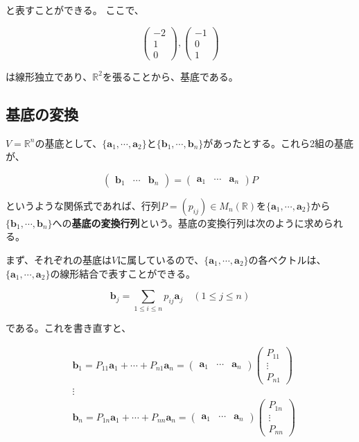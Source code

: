 \documentclass[dvipdfmx,autodetect-engine]{jsarticle}
\newcommand{\vecSpace}[1]{\mathbb{R}^{#1}}
\begin{document}
と表すことができる。
ここで、

$$
\begin{pmatrix}
-2 \\
1 \\
0
\end{pmatrix}, \begin{pmatrix}
-1 \\
0 \\
1
\end{pmatrix} 
$$

は線形独立であり、$\vecSpace{2}$を張ることから、基底である。

\subsection{基底の変換}

$V = \vecSpace{n}$の基底として、$\{\bm{a}_1, \cdots, \bm{a}_2\}$と$\{\bm{b}_1, \cdots, \bm{b}_n\}$があったとする。これら2組の基底が、

$$
\begin{pmatrix}
\bm{b}_1 & \cdots & \bm{b}_n
\end{pmatrix} =
\begin{pmatrix}
\bm{a}_1 & \cdots & \bm{a}_n
\end{pmatrix}P
$$

というような関係式であれば、行列$P = (p_{ij}) \in M_n(\mathbb{R})$を$\{\bm{a}_1, \cdots, \bm{a}_2\}$から$\{\bm{b}_1, \cdots, \bm{b}_n\}$への{\bf 基底の変換行列}という。基底の変換行列は次のように求められる。

まず、それぞれの基底は$V$に属しているので、$\{\bm{a}_1, \cdots, \bm{a}_2\}$の各ベクトルは、$\{\bm{a}_1, \cdots, \bm{a}_2\}$の線形結合で表すことができる。

$$
\bm{b}_j = \sum_{1 \leq i \leq n} p_{ij}\bm{a}_j \quad (1 \leq j \leq n)
$$

である。これを書き直すと、

\begin{eqnarray*}
&\bm{b}_1 = P_{11}\bm{a}_1 + \cdots + P_{n1}\bm{a}_n = 
\begin{pmatrix}
\bm{a}_1 & \cdots & \bm{a}_n
\end{pmatrix}
\begin{pmatrix}
P_{11} \\
\vdots \\
P_{n1}
\end{pmatrix} \\
&\vdots \\
&\bm{b}_n = P_{1n}\bm{a}_1 + \cdots + P_{nn}\bm{a}_n = 
\begin{pmatrix}
\bm{a}_1 & \cdots & \bm{a}_n
\end{pmatrix}
\begin{pmatrix}
P_{1n} \\
\vdots \\
P_{nn}
\end{pmatrix}
\end{eqnarray*}
\end{document}
